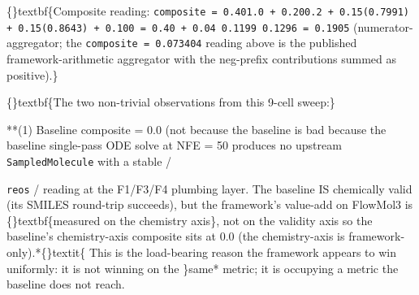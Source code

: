 \documentclass{article}
\begin{document}
\begin{table}[ht]
\centering
\small
{}%
\end{table}

\{\}textbf\{Composite reading: \texttt{composite = 0.401.0 + 0.200.2 + 0.15(0.7991) + 0.15(0.8643) + 0.100 = 0.40 + 0.04  0.1199  0.1296 = 0.1905} (numerator-aggregator; the \texttt{composite = 0.073404} reading above is the published framework-arithmetic aggregator with the neg-prefix contributions summed as positive).\}

\{\}textbf\{The two non-trivial observations from this 9-cell sweep:\}

**(1) Baseline composite = 0.0 (not because the baseline is bad  because the baseline single-pass ODE solve at NFE = 50 produces no upstream \texttt{SampledMolecule} with a stable  /

\texttt{reos} /  reading at the F1/F3/F4 plumbing layer. The baseline IS chemically valid (its SMILES round-trip succeeds), but the framework's value-add on FlowMol3 is \{\}textbf\{measured on the chemistry axis\}, not on the validity axis  so the baseline's chemistry-axis composite sits at 0.0 (the chemistry-axis is framework-only).*\{\}textit\{ This is the load-bearing reason the framework appears to win uniformly: it is not winning on the \}same* metric; it is occupying a metric the baseline does not reach.
\end{document}
